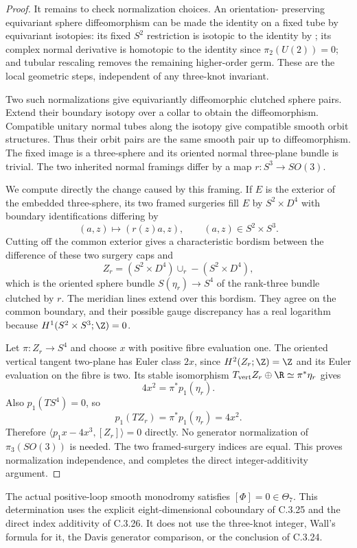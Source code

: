 \begin{proof}
It remains to check normalization choices. An orientation-
preserving equivariant sphere diffeomorphism can be made the
identity on a fixed tube by equivariant isotopies: its fixed
$S^2$ restriction is isotopic to the identity by
\citet[Theorem A]{Smale1959E}; its complex normal derivative
is homotopic to the identity since $\pi_2(U(2))=0$; and
tubular rescaling removes the remaining higher-order germ.
These are the local geometric steps, independent of any
three-knot invariant.

Two such normalizations give equivariantly diffeomorphic
clutched sphere pairs. Extend their boundary isotopy over a
collar to obtain the diffeomorphism. Compatible unitary normal
tubes along the isotopy give compatible smooth orbit structures.
Thus their orbit pairs are the same smooth pair up to
diffeomorphism. The fixed image is a three-sphere and its
oriented normal three-plane bundle is trivial. The two inherited
normal framings differ by a map $r:S^3\to SO(3)$.

We compute directly the change caused by this framing. If
$E$ is the exterior of the embedded three-sphere, its two
framed surgeries fill $E$ by $S^2\times D^4$ with boundary
identifications differing by
\[
 (a,z)\longmapsto(r(z)a,z),\qquad(a,z)\in S^2\times S^3.
\]
Cutting off the common exterior gives a characteristic bordism
between the difference of these two surgery caps and
\[
 Z_r=(S^2\times D^4)\cup_r-(S^2\times D^4),
\]
which is the oriented sphere bundle $S(\eta_r)\to S^4$ of
the rank-three bundle clutched by $r$. The meridian lines
extend over this bordism. They agree on the common boundary,
and their possible gauge discrepancy has a real logarithm
because $H^1(S^2\times S^3;\Z)=0$.

Let $\pi:Z_r\to S^4$ and choose $x$ with positive fibre
evaluation one. The oriented vertical tangent two-plane has
Euler class $2x$, since $H^2(Z_r;\Z)=\Z$ and its Euler
evaluation on the fibre is two. Its stable isomorphism
$T_{\mathrm{vert}}Z_r\oplus\R\simeq\pi^*\eta_r$ gives
\[
 4x^2=\pi^*p_1(\eta_r).
\]
Also $p_1(TS^4)=0$, so
\[
 p_1(TZ_r)=\pi^*p_1(\eta_r)=4x^2.
\]
Therefore $\langle p_1x-4x^3,[Z_r]\rangle=0$ directly.
No generator normalization of $\pi_3(SO(3))$ is needed.
The two framed-surgery indices are equal. This proves
normalization independence, and completes the direct
integer-additivity argument.
\end{proof}
\begin{corollary}
The actual positive-loop smooth monodromy satisfies
$[\Phi]=0\in\Theta_7$. This determination uses the explicit
eight-dimensional coboundary of C.3.25 and the direct index
additivity of C.3.26. It does not use the three-knot integer,
Wall's formula for it, the Davis generator comparison, or the
conclusion of C.3.24.
\end{corollary}
